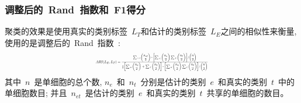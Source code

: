 \subsubsection{调整后的~Rand~指数和~F1得分}
聚类的效果是使用真实的类别标签~$L_T$和估计的类别标签~$L_E$之间的相似性来衡量,
使用的是调整后的~Rand~指数~\cite{hubert1985comparing,wu2005dynamic}:
\begin{equation}
\label{eq:ARI}
\resizebox{0.4\textwidth}{!}{$
    ARI(L_E,L_T)=\frac{\sum_{}{}_{e,t} \begin{pmatrix}n_{et}\\ 2\end{pmatrix} - \begin{bmatrix}  \sum_{}{}_{e} \begin{pmatrix}n_{e}\\ 2\end{pmatrix}\sum_{}{}_{t} \begin{pmatrix}n_{t}\\ 2\end{pmatrix}  \end{bmatrix} / \begin{pmatrix}n\\ 2\end{pmatrix} 
    }{\frac{1}{2}\begin{bmatrix}
    \sum{}{}_e\begin{pmatrix}n_{e}\\ 2\end{pmatrix} + \sum{}{}_t\begin{pmatrix}n_{t}\\ 2\end{pmatrix}
    \end{bmatrix} - \begin{bmatrix}
    \sum{}{}_e\begin{pmatrix}n_{e}\\ 2\end{pmatrix} \sum{}{}_t\begin{pmatrix}n_{t}\\ 2\end{pmatrix} 
    \end{bmatrix}/\begin{pmatrix}n\\ 2\end{pmatrix}}    
$}
\end{equation}
其中~$n$~是单细胞的总个数, 
$n_e$~和~$n_t$~分别是估计的类别~$e$~和真实的类别~$t$~中的单细胞数目; 
并且~$n_{et}$~是估计的类别~$e$~和真实的类别~$t$~共享的单细胞的数目。

